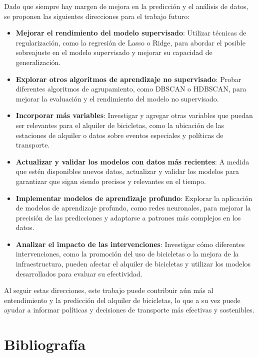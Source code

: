 \documentclass{wsdcr}
\begin{document}
Dado que siempre hay margen de mejora en la predicción y el análisis de datos, se proponen las siguientes direcciones para el trabajo futuro:

\begin{itemize}
    \item \textbf{Mejorar el rendimiento del modelo supervisado}: Utilizar técnicas de regularización, como la regresión de Lasso o Ridge, para abordar el posible sobreajuste en el modelo supervisado y mejorar su capacidad de generalización.
    \item \textbf{Explorar otros algoritmos de aprendizaje no supervisado}: Probar diferentes algoritmos de agrupamiento, como DBSCAN o HDBSCAN, para mejorar la evaluación y el rendimiento del modelo no supervisado.
    \item \textbf{Incorporar más variables}: Investigar y agregar otras variables que puedan ser relevantes para el alquiler de bicicletas, como la ubicación de las estaciones de alquiler o datos sobre eventos especiales y políticas de transporte.
    \item \textbf{Actualizar y validar los modelos con datos más recientes}: A medida que estén disponibles nuevos datos, actualizar y validar los modelos para garantizar que sigan siendo precisos y relevantes en el tiempo.
    \item \textbf{Implementar modelos de aprendizaje profundo}: Explorar la aplicación de modelos de aprendizaje profundo, como redes neuronales, para mejorar la precisión de las predicciones y adaptarse a patrones más complejos en los datos.
    \item \textbf{Analizar el impacto de las intervenciones}: Investigar cómo diferentes intervenciones, como la promoción del uso de bicicletas o la mejora de la infraestructura, pueden afectar el alquiler de bicicletas y utilizar los modelos desarrollados para evaluar su efectividad.

\end{itemize}

Al seguir estas direcciones, este trabajo puede contribuir aún más al entendimiento y la predicción del alquiler de bicicletas, lo que a su vez puede ayudar a informar políticas y decisiones de transporte más efectivas y sostenibles.



\section*{Bibliografía}
\end{document}
